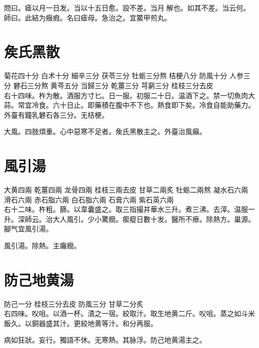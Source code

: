 問曰。瘧以月一日发。当以十五日愈。設不差。当月{\sungii 𥁞}解也。如其不差。当云何。\\
師曰。此結为癥瘕。名曰瘧母。急治之。宜鱉甲煎丸。

\section{矦氏黑散}

菊花{\scriptsize 四十分} 白术{\scriptsize 十分} 細辛{\scriptsize 三分} 茯苓{\scriptsize 三分} 牡蛎{\scriptsize 三分熬} 桔梗{\scriptsize 八分} 防風{\scriptsize 十分} 人参{\scriptsize 三分} 礬石{\scriptsize 三分熬} 黄芩{\scriptsize 五分} 当歸{\scriptsize 三分} 乾薑{\scriptsize 三分} 芎窮{\scriptsize 三分} 桂枝{\scriptsize 三分去皮}\\
右十四味。杵为散。酒服方寸匕。日一服。初服二十日。温酒下之。禁一切魚肉大蒜。常宜冷食。六十日止。即藥積在腹中不下也。熱食即下矣。冷食自能助藥力。{\scriptsize 外臺有鐘乳礬石各三分。无桔梗。}

大風。四肢煩重。心中惡寒不足者。矦氏黑散主之。{\scriptsize 外臺治風癲。}

\section{風引湯}

大黄{\scriptsize 四兩} 乾薑{\scriptsize 四兩} 龙骨{\scriptsize 四兩} 桂枝{\scriptsize 三兩去皮} 甘草{二兩炙} 牡蛎{\scriptsize 二兩熬} 凝水石{\scriptsize 六兩} 滑石{\scriptsize 六兩} 赤石脂{\scriptsize 六兩} 白石脂{\scriptsize 六兩} 石膏{\scriptsize 六兩} 紫石英{\scriptsize 六兩}\\
右十二味。杵粗。篩。以韋囊盛之。取三指撮井華水三升。煮三沸。去滓。温服一升。{\scriptsize 深師云。治大人風引。少小驚癇。瘈瘲日數十发。醫所不療。除熱方。巢源。腳气宜風引湯。}

風引湯。除熱。主癱癇。

\section{防己地黄湯}

防己{\scriptsize 一分} 桂枝{\scriptsize 三分去皮} 防風{\scriptsize 三分} 甘草{\scriptsize 二分炙}\\
右四味。㕮咀。以酒一杯。漬之一宿。絞取汁。取生地黄二斤。㕮咀。蒸之如斗米飯久。以銅器盛其汁。更絞地黄等汁。和分再服。

病如狂狀。妄行。獨語不休。无寒熱。其脉浮。防己地黄湯主之。


